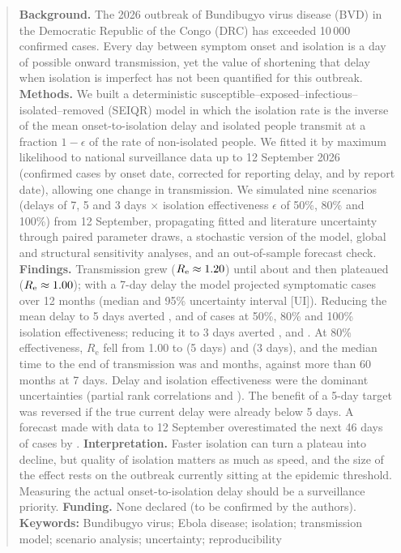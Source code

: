 \documentclass[11pt,a4paper]{article}
\newcommand{\Rt}{R_{\mathrm{e}}}
\begin{document}
\begin{abstract}\noindent
\textbf{Background.} The 2026 outbreak of Bundibugyo virus disease (BVD) in the Democratic Republic of the Congo (DRC) has exceeded 10\,000 confirmed cases. Every day between symptom onset and isolation is a day of possible onward transmission, yet the value of shortening that delay when isolation is imperfect has not been quantified for this outbreak.
\textbf{Methods.} We built a deterministic susceptible--exposed--infectious--isolated--removed (SEIQR) model in which the isolation rate is the inverse of the mean onset-to-isolation delay and isolated people transmit at a fraction $1-\epsilon$ of the rate of non-isolated people. We fitted it by maximum likelihood to national surveillance data up to 12 September 2026 (confirmed cases by onset date, corrected for reporting delay, and by report date), allowing one change in transmission. We simulated nine scenarios (delays of 7, 5 and 3 days $\times$ isolation effectiveness $\epsilon$ of 50\%, 80\% and 100\%) from 12 September, propagating fitted and literature uncertainty through \nDraws{} paired parameter draws, a stochastic version of the model, global and structural sensitivity analyses, and an out-of-sample forecast check.
\textbf{Findings.} Transmission grew ($\Rt\approx\fitBReBeforeMed$) until about \fitBtc{} and then plateaued ($\Rt\approx\fitBReAfterMed$); with a 7-day delay the model projected \baseCases{} symptomatic cases over 12 months (median and 95\% uncertainty interval [UI]). Reducing the mean delay to 5 days averted \pctMedFiftyFive, \pctMedEightyFive{} and \pctMedHundredFive{} of cases at 50\%, 80\% and 100\% isolation effectiveness; reducing it to 3 days averted \pctMedFiftyThree, \pctMedEightyThree{} and \pctMedHundredThree. At 80\% effectiveness, $\Rt$ fell from 1.00 to \ReMedEightyFive{} (5 days) and \ReMedEightyThree{} (3 days), and the median time to the end of transmission was \durEightyFive{} and \durEightyThree{} months, against more than 60 months at 7 days. Delay and isolation effectiveness were the dominant uncertainties (partial rank correlations \prccIsolationDelay{} and \prccIsolationEffectiveness). The benefit of a 5-day target was reversed if the true current delay were already below 5 days. A forecast made with data to 12 September overestimated the next 46 days of cases by \valErrLong.
\textbf{Interpretation.} Faster isolation can turn a plateau into decline, but quality of isolation matters as much as speed, and the size of the effect rests on the outbreak currently sitting at the epidemic threshold. Measuring the actual onset-to-isolation delay should be a surveillance priority.
\textbf{Funding.} None declared (to be confirmed by the authors).\\[3pt]
\textbf{Keywords:} Bundibugyo virus; Ebola disease; isolation; transmission model; scenario analysis; uncertainty; reproducibility
\end{abstract}
\end{document}
